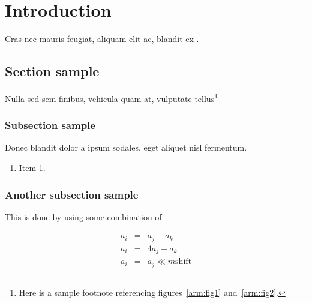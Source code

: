 \chapter{Introduction}

Cras nec mauris feugiat, aliquam elit ac, blandit ex \cite{article-full}.

\section{Section sample}\label{ch1:sec}

Nulla sed sem finibus, vehicula quam at, vulputate tellus\footnote{Here is a sample footnote referencing figures~\ref{arm:fig1}
and~\ref{arm:fig2}.}  

\subsection{Subsection sample}

%

Donec blandit dolor a ipsum sodales, eget aliquet nisl fermentum.

\begin{enumerate}
  \item Item 1.
\end{enumerate}

%

\subsection{Another subsection sample}

This is done by using some combination of

\begin{eqnarray*}
a_i & = & a_j + a_k \\
a_i & = & 4a_j + a_k \\
a_i & = & a_j \ll m \mbox{shift}
\end{eqnarray*}
